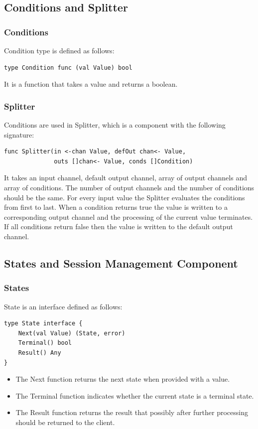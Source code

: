 \documentclass[12pt,a4paper]{article}
\begin{document}
\subsection{Conditions and Splitter}
\subsubsection{Conditions}
Condition type is defined as follows:

\begin{lstlisting}
type Condition func (val Value) bool
\end{lstlisting}
It is a function that takes a value and returns a boolean.

\subsubsection{Splitter}
Conditions are used in Splitter, which is a component with the 
following signature:

\begin{lstlisting}
func Splitter(in <-chan Value, defOut chan<- Value, 
			  outs []chan<- Value, conds []Condition)
\end{lstlisting}
It takes an input channel, default output channel, array of output channels and array of conditions.
The number of output channels and the number of conditions should be the same.
For every input value the Splitter evaluates the conditions from first to last.
When a condition returns true the value is written to a corresponding output channel 
and the processing of the current value terminates. If all conditions return false
then the value is written to the default output channel.

\subsection{States and Session Management Component}
\subsubsection{States}
State is an interface defined as follows:

\begin{lstlisting}
type State interface {
    Next(val Value) (State, error)
    Terminal() bool
    Result() Any
}
\end{lstlisting}
\begin{itemize}
	\item The Next function returns the next state when provided with a value.
	\item The Terminal function indicates whether the current state is a terminal state.
	\item The Result function returns the result that possibly after further 
				processing should be returned to the client.
\end{itemize}
\end{document}
